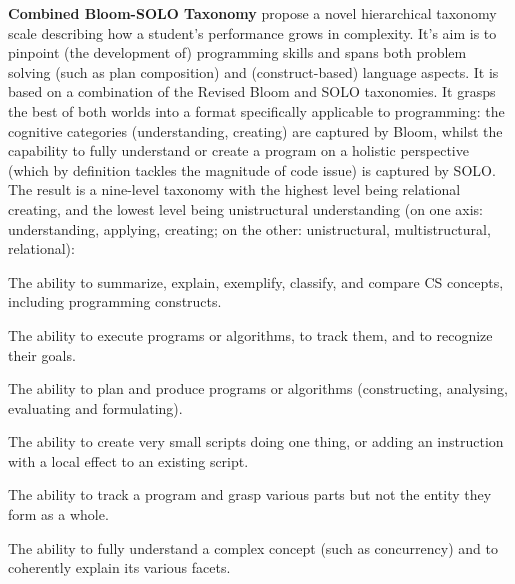 \noindent \textbf{Combined Bloom-SOLO Taxonomy}\newline
{}
 propose a novel hierarchical taxonomy scale describing how a student’s performance grows in complexity. It’s aim is to pinpoint (the development of) programming skills and spans both problem solving (such as plan composition) and (construct-based) language aspects. It is based on a combination of the Revised Bloom and SOLO taxonomies.  It grasps the best of both worlds into a format specifically applicable to programming: the cognitive categories (understanding, creating) are captured by Bloom, whilst the capability to fully understand or create a program on a holistic perspective (which by definition tackles the magnitude of code issue) is captured by SOLO. The result is a nine-level taxonomy with the highest level being relational creating, and the lowest level being unistructural understanding (on one axis: understanding, applying, creating; on the other: unistructural, multistructural, relational):



\begin{description}[leftmargin=1em]
\item[Understanding:] The ability to summarize, explain, exemplify,
    classify, and compare CS concepts, including programming constructs.
\item[Applying:] The ability to execute programs or algorithms, to track
    them, and to recognize their goals.
\item[Creating:] The ability to plan and produce programs or algorithms
    (constructing, analysing, evaluating and formulating).
\item[Unistructural:] The ability to create very small scripts doing one
    thing, or adding an instruction with a local effect to an existing
    script.
\item[Multistructural:] The ability to track a program and grasp various
    parts but not the entity they form as a whole.
\item[Relational:] The ability to fully understand a complex concept (such
    as concurrency) and to coherently explain its various facets.
\end{description}

